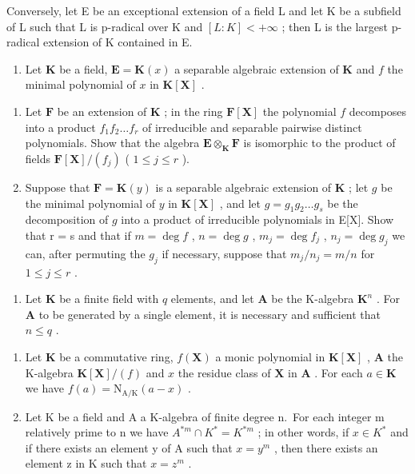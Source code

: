 Conversely, let E be an exceptional extension of a field L and let K be a subfield of L such that L is p-radical over K and \([L:K]<+\infty\) ; then L is the largest p-radical extension of K contained in E.

\begin{enumerate}
\def\labelenumi{\arabic{enumi})}
\setcounter{enumi}{3}
\tightlist
\item
  Let \(\mathbf{K}\) be a field, \(\mathbf{E} = \mathbf{K}(x)\) a separable algebraic extension of \(\mathbf{K}\) and \(f\) the minimal polynomial of \(x\) in \(\mathbf{K}[\mathbf{X}]\) .
\end{enumerate}

\begin{enumerate}
\def\labelenumi{\alph{enumi})}
\item
  Let \(\mathbf{F}\) be an extension of \(\mathbf{K}\) ; in the ring \(\mathbf{F}[\mathbf{X}]\) the polynomial \(f\) decomposes into a product \(f_{1}f_{2}\ldots f_{r}\) of irreducible and separable pairwise distinct polynomials. Show that the algebra \(\mathbf{E} \otimes_{\mathbf{K}} \mathbf{F}\) is isomorphic to the product of fields \(\mathbf{F}[\mathbf{X}] / (f_j)\) ( \(1 \leqslant j \leqslant r\) ).
\item
  Suppose that \(\mathbf{F} = \mathbf{K}(y)\) is a separable algebraic extension of \(\mathbf{K}\) ; let \(g\) be the minimal polynomial of \(y\) in \(\mathbf{K}[\mathbf{X}]\) , and let \(g = g_1g_2\ldots g_s\) be the decomposition of \(g\) into a product of irreducible polynomials in E{[}X{]}. Show that r = s and that if \(m = \deg f\) , \(n = \deg g\) , \(m_j = \deg f_j\) , \(n_j = \deg g_j\) we can, after permuting the \(g_j\) if necessary, suppose that \(m_j / n_j = m / n\) for \(1 \leq j \leq r\) .
\end{enumerate}

\begin{enumerate}
\def\labelenumi{\arabic{enumi})}
\setcounter{enumi}{4}
\tightlist
\item
  Let \(\mathbf{K}\) be a finite field with \(q\) elements, and let \(\mathbf{A}\) be the K-algebra \(\mathbf{K}^n\) . For \(\mathbf{A}\) to be generated by a single element, it is necessary and sufficient that \(n \leqslant q\) .
\end{enumerate}

\BourbakiExerciseGroup

\begin{enumerate}
\def\labelenumi{\arabic{enumi})}
\item
  Let \(\mathbf{K}\) be a commutative ring, \(f(\mathbf{X})\) a monic polynomial in \(\mathbf{K}[\mathbf{X}]\) , \(\mathbf{A}\) the K-algebra \(\mathbf{K}[\mathbf{X}] / (f)\) and \(x\) the residue class of \(\mathbf{X}\) in \(\mathbf{A}\) . For each \(a \in \mathbf{K}\) we have \(f(a) = \mathrm{N}_{\mathrm{A} / \mathrm{K}}(a - x)\) .
\item
  Let K be a field and A a K-algebra of finite degree n.~For each integer m relatively prime to n we have \(A^{*m} \cap K^{*} = K^{*m}\) ; in other words, if \(x \in K^{*}\) and if there exists an element y of A such that \(x = y^{m}\) , then there exists an element z in K such that \(x = z^{m}\) .
\end{enumerate}

